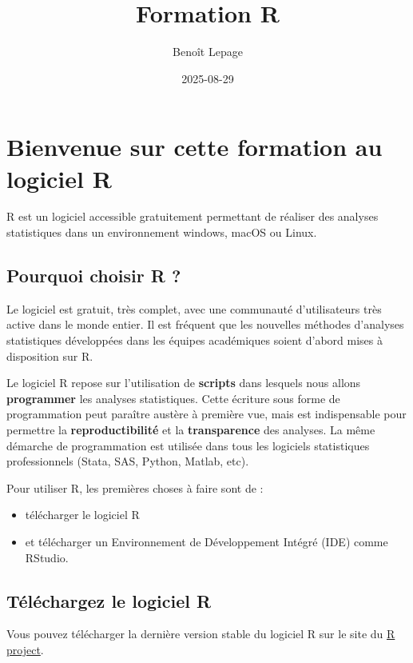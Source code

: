 \documentclass[
]{book}
\title{Formation R}
\author{Benoît Lepage}
\date{2025-08-29}
\providecommand{\tightlist}{%
  \setlength{\itemsep}{0pt}\setlength{\parskip}{0pt}}
\begin{document}
\maketitle

{
\setcounter{tocdepth}{1}
\tableofcontents
}
\chapter{Bienvenue sur cette formation au logiciel R}\label{bienvenue-sur-cette-formation-au-logiciel-r}

R est un logiciel accessible gratuitement permettant de réaliser des analyses statistiques dans un environnement windows, macOS ou Linux.

\section{Pourquoi choisir R ?}\label{pourquoi-choisir-r}

Le logiciel est gratuit, très complet, avec une communauté d'utilisateurs très active dans le monde entier. Il est fréquent que les nouvelles méthodes d'analyses statistiques développées dans les équipes académiques soient d'abord mises à disposition sur R.

Le logiciel R repose sur l'utilisation de \textbf{scripts} dans lesquels nous allons \textbf{programmer} les analyses statistiques. Cette écriture sous forme de programmation peut paraître austère à première vue, mais est indispensable pour permettre la \textbf{reproductibilité} et la \textbf{transparence} des analyses. La même démarche de programmation est utilisée dans tous les logiciels statistiques professionnels (Stata, SAS, Python, Matlab, etc).

Pour utiliser R, les premières choses à faire sont de :

\begin{itemize}
\tightlist
\item
  télécharger le logiciel R
\item
  et télécharger un Environnement de Développement Intégré (IDE) comme RStudio.
\end{itemize}

\section{Téléchargez le logiciel R}\label{tuxe9luxe9chargez-le-logiciel-r}

Vous pouvez télécharger la dernière version stable du logiciel R sur le site du \href{https://www.r-project.org/}{R project}.
\end{document}
